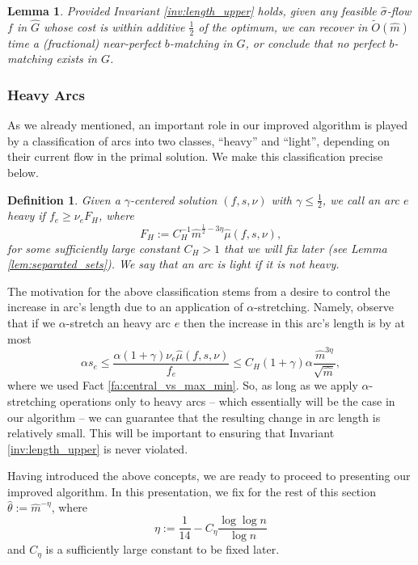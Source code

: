 \documentclass[11pt, letterpaper]{article}
\newtheorem{lemma}[theorem]{Lemma}
\newtheorem{definition}[theorem]{Definition}
\newcommand{\ceta}{C_{\eta}}
\newcommand{\cheavy}{C_{H}}
\newcommand{\fheavy}{F_{H}}
\newcommand{\tO}[1]{\widetilde{O}(#1)}
\newcommand{\hG}{\widehat{G}}
\newcommand{\hm}{\widehat{m}}
\newcommand{\hmu}{\hat{\mu}}
\newcommand{\htheta}{\hat{\theta}}
\newcommand{\vnu}{\boldsymbol{\mathit{\nu}}}
\newcommand{\hvsigma}{\boldsymbol{\mathit{\hat{\sigma}}}}
\newcommand{\bb}{\boldsymbol{\mathit{b}}}
\newcommand{\ff}{\boldsymbol{\mathit{f}}}
\renewcommand{\ss}{\boldsymbol{\mathit{s}}}
\begin{document}
\begin{lemma}
\label{lem:perturbed_solution}
Provided Invariant \ref{inv:length_upper} holds, given any feasible $\hvsigma$-flow $\ff$ in $\hG$ whose cost is within additive $\frac{1}{2}$ of the optimum, we can recover in $\tO{\hm}$ time a (fractional) near-perfect $\bb$-matching in $G$, or conclude that no perfect $\bb$-matching exists in $G$. 
\end{lemma}

\subsubsection*{Heavy Arcs}

As we already mentioned, an important role in our improved algorithm is played by a classification of arcs into two classes, ``heavy'' and ``light'', depending on their current flow in the primal solution. We make this classification precise below.  

\begin{definition}\label{def:heavy}
Given a $\gamma$-centered solution $(\ff,\ss,\vnu)$ with $\gamma\leq \frac{1}{2}$, we call an arc $e$ {\em heavy} if $f_e\geq \nu_e \fheavy$, where
\[
\fheavy:=\cheavy^{-1} \hm^{\frac{1}{2}-3\eta} \hmu(\ff,\ss,\vnu),  
\]
for some sufficiently large constant $\cheavy>1$ that we will fix later (see Lemma \ref{lem:separated_sets}). We say that an arc is {\em light} if it is not heavy.
\end{definition}

The motivation for the above classification stems from a desire to control the increase in arc's length due to an application of $\alpha$-stretching.  Namely, observe that if we $\alpha$-stretch an heavy arc $e$ then the increase in this arc's length is by at most 
\[
\alpha s_e \leq \frac{\alpha (1+\gamma) \nu_e \hmu(\ff,\ss,\vnu)}{f_e} \leq \cheavy (1+\gamma) \alpha \frac{\hm^{3\eta}}{\sqrt{\hm}}, 
\] 
where we used Fact \ref{fa:central_vs_max_min}. So, as long as we apply $\alpha$-stretching operations only to heavy arcs -- which essentially will be the case in our algorithm -- we can guarantee that the resulting change in arc length is relatively small. This will be important to ensuring that Invariant \ref{inv:length_upper} is never violated. 


Having introduced the above concepts, we are ready to proceed to presenting our improved algorithm. In this presentation, we fix for the rest of this section $\htheta:=\hm^{-\eta}$, where 
\begin{equation}\label{eq:def_eta}
\eta:=\frac{1}{14}-\ceta \frac{\log \log n}{\log n}
\end{equation}
 and $\ceta$ is a sufficiently large constant to be fixed later. 
\end{document}

